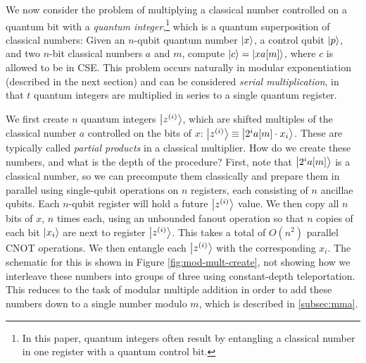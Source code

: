 \documentclass[twoside]{article}
\begin{document}
We now consider the problem of multiplying a classical number controlled
on a quantum bit with a
\emph{quantum integer},\footnote{In this paper, quantum
integers often result by entangling a classical number in one register with a
quantum control bit.} which is a
quantum superposition of classical numbers:
Given an $n$-qubit quantum number $\left\vert{x}\right\rangle$, a control qubit $\left\vert{p}\right\rangle$,
and two $n$-bit classical numbers $a$
and $m$,
compute $\left\vert{c}\right\rangle = \left\vert{xa[m]}\right\rangle$, where $c$ is allowed to be in CSE.
This problem occurs naturally in modular exponentiation (described in
the next section) and can be considered \emph{serial multiplication},
in that $t$ quantum integers are multiplied in series to a single
quantum register.

We first create $n$ quantum integers $\left\vert{z^{(i)}}\right\rangle$,
which are shifted multiples of the classical number $a$ controlled on the bits
of $x$:
$\left\vert{z^{(i)}}\right\rangle \equiv \left\vert{2^i a[m] \cdot x_i }\right\rangle$.
These are typically called \emph{partial products} in a classical multiplier.
How do we create these numbers, and what is the depth of the procedure?
First, note that $\left\vert{2^i a[m]}\right\rangle$ is a classical number, so we can
precompute them classically and prepare them in parallel using single-qubit
operations
on $n$ registers, each consisting of $n$ ancillae qubits. Each $n$-qubit
register will hold a future $\left\vert{z^{(i)}}\right\rangle$ value.
We then copy all
$n$ bits of $x$, $n$ times each, using an unbounded fanout operation so that
$n$ copies of each bit $\left\vert{x_i}\right\rangle$ are next to register $\left\vert{z^{(i)}}\right\rangle$.
This takes a total of $O(n^2)$ parallel CNOT operations.
We then entangle each $\left\vert{z^{(i)}}\right\rangle$ with the corresponding $x_i$.
The schematic for this is shown in Figure \ref{fig:mod-mult-create}, not
showing how we interleave these numbers into groups of three using
constant-depth teleportation. This reduces to the task of modular
multiple addition in order to add these numbers down to a single
number modulo $m$, which is described in \ref{subsec:mma}.

\end{document}
